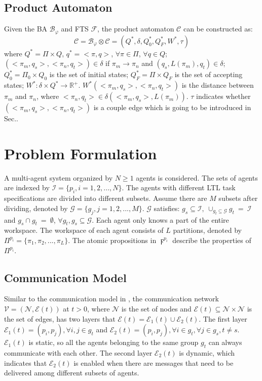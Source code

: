 \documentclass[journal]{IEEEtran}
\begin{document}
\subsection{Product Automaton}
Given the BA $\mathcal{B}_\varphi$ and FTS $\mathcal{F}$, the product automaton $\mathcal{C}$ can be constructed as:
$$\mathcal{C}=\mathcal{B}_\varphi\otimes \mathcal{C}=(Q^{\ast},\delta,Q^{\ast}_0,Q^{\ast}_F,W^{\ast},\tau)$$
where $Q^{\ast}=\Pi\times Q$, $q^{\ast}=<\pi,q>$, $\forall \pi \in \Pi$, $\forall q \in Q$; $(<\pi_m,q_s>,<\pi_n,q_t>)\in \delta$ if $\pi_m \rightarrow \pi_n$ and $(q_s,L(\pi_m),q_t)\in \delta$; $Q^{\ast}_0=\Pi_0\times Q_0$ is the set of initial states; $Q^{\ast}_F=\Pi\times Q_F$ is the set of accepting states; $W^{\ast}:\delta\times Q^{\ast}\rightarrow \mathbb{R}^{+}$. $W^{\ast}(<\pi_m,q_s>,<\pi_n,q_t>)$ is the distance between $\pi_m$ and $\pi_n$, where $<\pi_n,q_t>\in \delta(<\pi_m,q_s>,L(\pi_m))$. $\tau$ indicates whether $(<\pi_m,q_s>,<\pi_n,q_t>)$ is a couple edge which is going to be introduced in Sec.\uppercase\expandafter{}.
\section{Problem Formulation}
A multi-agent system organized by $N\geq1$ agents is considered. The sets of agents are indexed by $\mathcal{I}=\{p_i,i=1,2,...,N\}$. The agents with different LTL task specifications are divided into different subsets. Assume there are $M$ subsets after dividing, denoted by $\mathcal{G}=\{g_j,j=1,2,...,M\}$. $\mathcal{G}$ satisfies: $g_s\subseteq \mathcal{I},\ \cup_{g_t\subseteq \mathcal{G}}g_t\ =\ \mathcal{I}$ and $g_s\cap g_t\ =\ \emptyset$, $\forall g_t,g_s \subseteq \mathcal{G}$.
Each agent only knows a part of the entire workspace. The workspace of each agent consists of $L$ partitions, denoted by $\Pi^{p_i}=\{\pi_1,\pi_2,...,\pi_L\}$. The atomic propositions in $\digamma^{p_i}$ describe the properties of $\Pi^{p_i}$.
\subsection{Communication Model}
Similar to the communication model in \cite{guo2017task}, the communication network $\mathcal{V}=(\mathcal{N},\mathcal{E}(t))$ at $t>0$, where $\mathcal{N}$ is the set of nodes and $\mathcal{E}(t)\subseteq \mathcal{N} \times \mathcal{N}$ is the set of edges, has two layers that $\mathcal{E}(t)=\mathcal{E}_1(t)\cup \mathcal{E}_2(t)$. The first layer $\mathcal{E}_1(t)={(p_i,p_j),\forall i,j\in g_t}$ and $\mathcal{E}_2(t)={(p_i,p_j),\forall i\in g_t,\forall j \in g_s, t\neq s}$. $\mathcal{E}_1(t)$ is static, so all the agents belonging to the same group $g_t$ can always communicate with each other. The second layer $\mathcal{E}_2(t)$ is dynamic, which indicates that $\mathcal{E}_2(t)$ is enabled when there are messages that need to be delivered among different subsets of agents.
\end{document}
